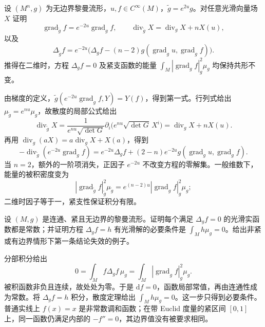 \begin{exercise}\label{g3:ex:conformal-laplacian}
	设 \((M^n,g)\) 为无边界黎曼流形，\(u,f\in C^\infty(M)\)，\(\widetilde g=e^{2u}g\)。对任意光滑向量场 \(X\) 证明
	\[
		\operatorname{grad}_{\widetilde g}f=e^{-2u}\operatorname{grad}_g f,
		\qquad \operatorname{div}_{\widetilde g}X=\operatorname{div}_gX+nX(u),
	\]
	以及
	\[
		\Delta_{\widetilde g}f
		=e^{-2u}\bigl(\Delta_g f-(n-2)g(\operatorname{grad}_g u,\operatorname{grad}_g f)\bigr).
	\]
	推得在二维时，方程 \(\Delta_g f=0\) 及紧支函数的能量 \(\int_M|\operatorname{grad}_g f|_g^2\mu_g\) 均保持共形不变。
\end{exercise}
\begin{solution}
	由梯度的定义，\(\widetilde g(e^{-2u}\operatorname{grad}_g f,Y)=Y(f)\)，得到第一式。行列式给出 \(\mu_{\widetilde g}=e^{nu}\mu_g\)，故散度的局部公式给出
	\[
		\operatorname{div}_{\widetilde g}X
		=\frac{1}{e^{nu}\sqrt{\det G}}\partial_i
		\bigl(e^{nu}\sqrt{\det G}\,X^i\bigr)
		=\operatorname{div}_gX+nX(u).
	\]
	再用 \(\operatorname{div}_g(aX)=a\operatorname{div}_gX+X(a)\)，得到
	\[
		-\operatorname{div}_{\widetilde g}(e^{-2u}\operatorname{grad}_g f)
		=e^{-2u}\Delta_g f+(2-n)e^{-2u}g(\operatorname{grad}_g u,\operatorname{grad}_g f).
	\]
	当 \(n=2\)，额外的一阶项消失，正因子 \(e^{-2u}\) 不改变方程的零解集。一般维数下，能量的被积密度变为
	\[
		|\operatorname{grad}_{\widetilde g}f|_{\widetilde g}^2\mu_{\widetilde g}
		=e^{(n-2)u}|\operatorname{grad}_g f|_g^2\mu_g;
	\]
	二维时因子等于一，紧支性保证积分有限。
\end{solution}

\begin{exercise}\label{g3:ex:compact-harmonic-functions}
	设 \((M,g)\) 是连通、紧且无边界的黎曼流形。证明每个满足 \(\Delta_g f=0\) 的光滑实函数都是常数；并证明方程 \(\Delta_g f=h\) 有光滑解的必要条件是 \(\int_M h\mu_g=0\)。给出非紧或有边界情形下第一条结论失效的例子。
\end{exercise}
\begin{solution}
	分部积分给出
	\[
		0=\int_M f\Delta_g f\,\mu_g
		=\int_M|\operatorname{grad}_g f|_g^2\mu_g.
	\]
	被积函数非负且连续，故处处为零。于是 \(\mathrm df=0\)，函数局部常值，再由连通性成为常数。将 \(\Delta_g f=h\) 积分，散度定理给出 \(\int_Mh\mu_g=0\)。这一步只得到必要条件。普通实线上 \(f(x)=x\) 是非常数调和函数；在带 Euclid 度量的紧区间 \([0,1]\) 上，同一函数仍满足内部的 \(-f''=0\)，其边界值没有被要求相同。
\end{solution}

